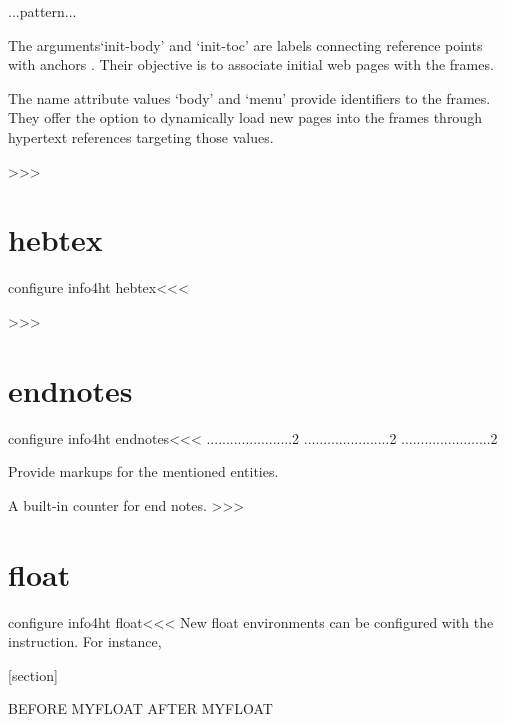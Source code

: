 {{{{\begin{tabular / array}{...pattern...}
\begin{...}
The arguments`init-body' and `init-toc' are labels connecting reference points 
 with anchors \EndLink.  Their objective 
is to associate initial web pages with the frames. 
 
The name attribute values `body' and `menu' provide 
identifiers to the frames.  They offer the option to dynamically load 
new pages into the frames through hypertext references targeting those 
values. 

>>>




\section{hebtex}
                
\<configure info4ht hebtex\><<<

>>>




\section{endnotes}

\<configure info4ht endnotes\><<<
......................2
......................2
.......................2

  Provide markups for the mentioned entities.

\endnoteN

  A built-in counter for end notes.
>>>


\section{float}

\<configure info4ht float\><<<
New float environments can be configured with the \ConfigureEnv
instruction. For instance,
   
   [section]
   
     {BEFORE MYFLOAT}  {AFTER MYFLOAT}
     {}{}
   

\end{...}
\end{tabular / array}}}}}
